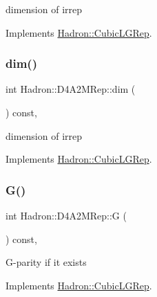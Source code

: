 dimension of irrep 

Implements \mbox{\hyperlink{structHadron_1_1CubicLGRep_a3acbaea26503ed64f20df693a48e4cdd}{Hadron\+::\+Cubic\+L\+G\+Rep}}.

\mbox{\label{structHadron_1_1D4A2MRep_a9f511013d556bb6632884f49e20d5c7e}} 
\subsubsection{\texorpdfstring{dim()}{dim()}\hspace{0.1cm}{\footnotesize\ttfamily [3/3]}}
{\footnotesize\ttfamily int Hadron\+::\+D4\+A2\+M\+Rep\+::dim (\begin{DoxyParamCaption}{ }\end{DoxyParamCaption}) const\hspace{0.3cm}{\ttfamily [inline]}, {\ttfamily [virtual]}}

dimension of irrep 

Implements \mbox{\hyperlink{structHadron_1_1CubicLGRep_a3acbaea26503ed64f20df693a48e4cdd}{Hadron\+::\+Cubic\+L\+G\+Rep}}.

\mbox{\label{structHadron_1_1D4A2MRep_ae60f1ea025e472e961b4c3804a34f1e0}} 
\subsubsection{\texorpdfstring{G()}{G()}\hspace{0.1cm}{\footnotesize\ttfamily [1/3]}}
{\footnotesize\ttfamily int Hadron\+::\+D4\+A2\+M\+Rep\+::G (\begin{DoxyParamCaption}{ }\end{DoxyParamCaption}) const\hspace{0.3cm}{\ttfamily [inline]}, {\ttfamily [virtual]}}

G-\/parity if it exists 

Implements \mbox{\hyperlink{structHadron_1_1CubicLGRep_ace26f7b2d55e3a668a14cb9026da5231}{Hadron\+::\+Cubic\+L\+G\+Rep}}.

\mbox{\label{structHadron_1_1D4A2MRep_ae60f1ea025e472e961b4c3804a34f1e0}} 
